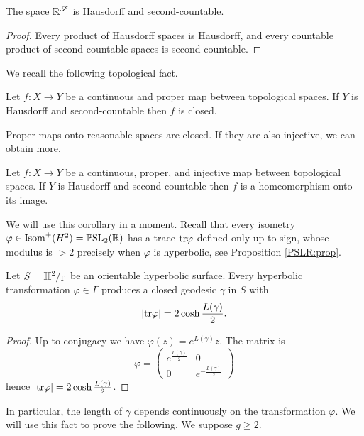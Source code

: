 \begin{prop}
The space $\mathbb{R}^\mathscr{S}$ is Hausdorff and second-countable.
\end{prop}
\begin{proof}
Every product of Hausdorff spaces is Hausdorff, and every countable product of second-countable spaces is second-countable.
\end{proof}

We recall the following topological fact.

\begin{prop} \label{propria:chiusa:prop}
Let $f\colon X \to Y$ be a continuous and proper map between topological spaces. If $Y$ is Hausdorff and second-countable then $f$ is closed.
\end{prop}

Proper maps onto reasonable spaces are closed. If they are also injective, we can obtain more.

\begin{cor} \label{propria:chiusa:cor}
Let $f\colon X \to Y$ be a continuous, proper, and injective map between topological spaces. If $Y$ is Hausdorff and second-countable then $f$ is a homeomorphism onto its image. 
\end{cor}

We will use this corollary in a moment.
Recall that every isometry $\varphi\in {\rm Isom}^+(H^2) = \mathbb{P}{\rm SL}_2(\mathbb{R})$ has a trace ${\rm tr} \varphi$ defined only up to sign, whose modulus is $>2$ precisely when $\varphi$ is hyperbolic, see Proposition \ref{PSLR:prop}.

\begin{prop} \label{trace:prop}
Let $S = \mathbb{H}^2/_\Gamma$ be an orientable hyperbolic surface. Every hyperbolic transformation $\varphi\in\Gamma$ produces a closed geodesic $\gamma$ in $S$
with
$$|{\rm tr}\varphi| = 2\cosh \frac {L(\gamma)} 2.$$
\end{prop}
\begin{proof}
Up to conjugacy we have $\varphi(z) = e^{L(\gamma)} z$. The matrix is 
$$\varphi = \left(\begin{matrix} e^{\frac{L(\gamma)}2} & 0 \\ 0 & e^{-\frac{L(\gamma)}2} \end{matrix}\right)$$
hence $|{\rm tr}\varphi| = 2\cosh \frac{L(\gamma)}2$.
\end{proof}

In particular, the length of $\gamma$ depends continuously on the transformation $\varphi$. We will use this fact to prove the following. We suppose $g\geqslant 2$.

